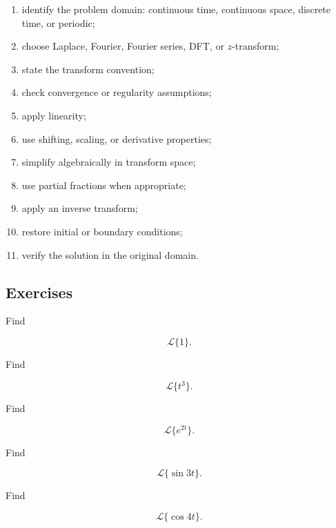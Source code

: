 \begin{enumerate}
    \item identify the problem domain: continuous time, continuous space,
          discrete time, or periodic;
    \item choose Laplace, Fourier, Fourier series, DFT, or \(z\)-transform;
    \item state the transform convention;
    \item check convergence or regularity assumptions;
    \item apply linearity;
    \item use shifting, scaling, or derivative properties;
    \item simplify algebraically in transform space;
    \item use partial fractions when appropriate;
    \item apply an inverse transform;
    \item restore initial or boundary conditions;
    \item verify the solution in the original domain.
\end{enumerate}

\subsection{Exercises}
\label{subsec:transform-tables-exercises}

\begin{exercise}[1]
Find

\[
\mathcal{L}\{1\}.
\]
\end{exercise}

\begin{exercise}[1]
Find

\[
\mathcal{L}\{t^3\}.
\]
\end{exercise}

\begin{exercise}[1]
Find

\[
\mathcal{L}\{e^{2t}\}.
\]
\end{exercise}

\begin{exercise}[1]
Find

\[
\mathcal{L}\{\sin3t\}.
\]
\end{exercise}

\begin{exercise}[1]
Find

\[
\mathcal{L}\{\cos4t\}.
\]
\end{exercise}

